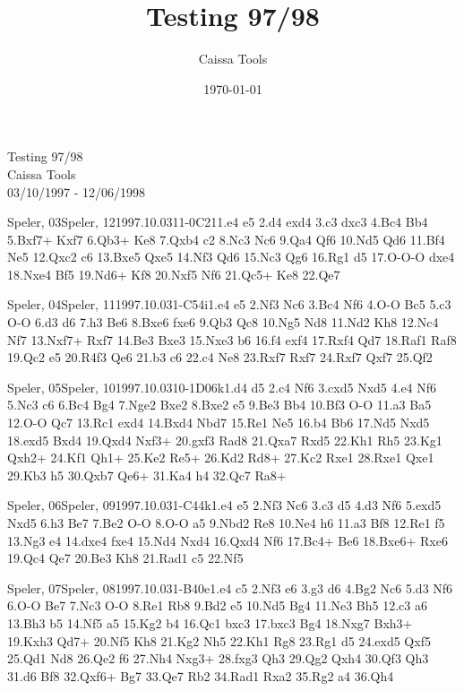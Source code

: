 \documentclass[twocolumn,a4paper,10pt]{report}
\title{Testing 97/98}
\author{Caissa Tools}
\date{\today{}}
\begin{document}
\begin{titlepage}
  \begin{center}
    \huge Testing 97/98 \\
    \vspace{1in}
    \large Caissa Tools \\
    \vspace{1in}
    \large 03/10/1997 - 12/06/1998 \\
  \end{center}
\end{titlepage}

\begin{chessgame}{Speler, 03}{Speler, 12}{1997.10.03}{1}{1-0}{C21}{1.e4 e5 2.d4 exd4 3.c3 dxc3 4.Bc4 Bb4 5.Bxf7+ Kxf7 6.Qb3+ Ke8 7.Qxb4 c2 8.Nc3 Nc6 9.Qa4 Qf6 10.Nd5 Qd6 11.Bf4 Ne5 12.Qxc2 c6 13.Bxe5 Qxe5 14.Nf3 Qd6 15.Nc3 Qg6 16.Rg1 d5 17.O-O-O dxe4 18.Nxe4 Bf5 19.Nd6+ Kf8 20.Nxf5 Nf6 21.Qc5+ Ke8 22.Qe7\mate}\end{chessgame}
\begin{chessgame}{Speler, 04}{Speler, 11}{1997.10.03}{1}{\textonehalf-\textonehalf}{C54i}{1.e4 e5 2.Nf3 Nc6 3.Bc4 Nf6 4.O-O Bc5 5.c3 O-O 6.d3 d6 7.h3 Be6 8.Bxe6 fxe6 9.Qb3 Qc8 10.Ng5 Nd8 11.Nd2 Kh8 12.Nc4 Nf7 13.Nxf7+ Rxf7 14.Be3 Bxe3 15.Nxe3 b6 16.f4 exf4 17.Rxf4 Qd7 18.Raf1 Raf8 19.Qc2 e5 20.R4f3 Qe6 21.b3 c6 22.c4 Ne8 23.Rxf7 Rxf7 24.Rxf7 Qxf7 25.Qf2}\end{chessgame}
\begin{chessgame}{Speler, 05}{Speler, 10}{1997.10.03}{1}{0-1}{D06k}{1.d4 d5 2.c4 Nf6 3.cxd5 Nxd5 4.e4 Nf6 5.Nc3 c6 6.Bc4 Bg4 7.Nge2 Bxe2 8.Bxe2 e5 9.Be3 Bb4 10.Bf3 O-O 11.a3 Ba5 12.O-O Qc7 13.Rc1 exd4 14.Bxd4 Nbd7 15.Re1 Ne5 16.b4 Bb6 17.Nd5 Nxd5 18.exd5 Bxd4 19.Qxd4 Nxf3+ 20.gxf3 Rad8 21.Qxa7 Rxd5 22.Kh1 Rh5 23.Kg1 Qxh2+ 24.Kf1 Qh1+ 25.Ke2 Re5+ 26.Kd2 Rd8+ 27.Kc2 Rxe1 28.Rxe1 Qxe1 29.Kb3 h5 30.Qxb7 Qe6+ 31.Ka4 h4 32.Qc7 Ra8+}\end{chessgame}
\begin{chessgame}{Speler, 06}{Speler, 09}{1997.10.03}{1}{\textonehalf-\textonehalf}{C44k}{1.e4 e5 2.Nf3 Nc6 3.c3 d5 4.d3 Nf6 5.exd5 Nxd5 6.h3 Be7 7.Be2 O-O 8.O-O a5 9.Nbd2 Re8 10.Ne4 h6 11.a3 Bf8 12.Re1 f5 13.Ng3 e4 14.dxe4 fxe4 15.Nd4 Nxd4 16.Qxd4 Nf6 17.Bc4+ Be6 18.Bxe6+ Rxe6 19.Qc4 Qe7 20.Be3 Kh8 21.Rad1 c5 22.Nf5}\end{chessgame}
\begin{chessgame}{Speler, 07}{Speler, 08}{1997.10.03}{1}{\textonehalf-\textonehalf}{B40e}{1.e4 c5 2.Nf3 e6 3.g3 d6 4.Bg2 Nc6 5.d3 Nf6 6.O-O Be7 7.Nc3 O-O 8.Re1 Rb8 9.Bd2 e5 10.Nd5 Bg4 11.Ne3 Bh5 12.c3 a6 13.Bh3 b5 14.Nf5 a5 15.Kg2 b4 16.Qc1 bxc3 17.bxc3 Bg4 18.Nxg7 Bxh3+ 19.Kxh3 Qd7+ 20.Nf5 Kh8 21.Kg2 Nh5 22.Kh1 Rg8 23.Rg1 d5 24.exd5 Qxf5 25.Qd1 Nd8 26.Qe2 f6 27.Nh4 Nxg3+ 28.fxg3 Qh3 29.Qg2 Qxh4 30.Qf3 Qh3 31.d6 Bf8 32.Qxf6+ Bg7 33.Qe7 Rb2 34.Rad1 Rxa2 35.Rg2 a4 36.Qh4}\end{chessgame}
\end{document}
